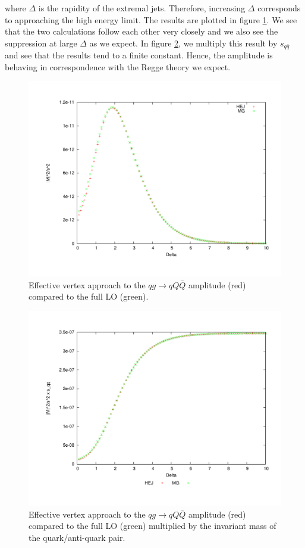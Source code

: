 where $\Delta$ is the rapidity of the extremal jets. Therefore, increasing $\Delta$ corresponds to approaching the high energy limit. The results are plotted in figure \ref{fig:qg_qqqx}. We see that the two calculations follow each other very closely and we also see the suppression at large $\Delta$ as we expect. In figure \ref{fig:qg_qqqx_sqqx}, we multiply this result by $s_{q \bar{q}}$ and see that the results tend to a finite constant. Hence, the amplitude is behaving in correspondence with the Regge theory we expect. 
\begin{figure}[H]
\centering
\includegraphics[scale= 0.45]{Images/qg_qqqx.pdf}
\caption{Effective vertex approach to the $qg \to qQ\bar{Q}$ amplitude (red) compared to the full LO (green).}
\label{fig:qg_qqqx}
\end{figure}

\begin{figure}[H]
\centering
\includegraphics[scale=0.45]{Images/qg_qQQx_sqqx.pdf}
\caption{Effective vertex approach to the $qg \to qQ\bar{Q}$ amplitude (red) compared to the full LO (green) multiplied by the invariant mass of the quark/anti-quark pair.}
\label{fig:qg_qqqx_sqqx}
\end{figure} 

